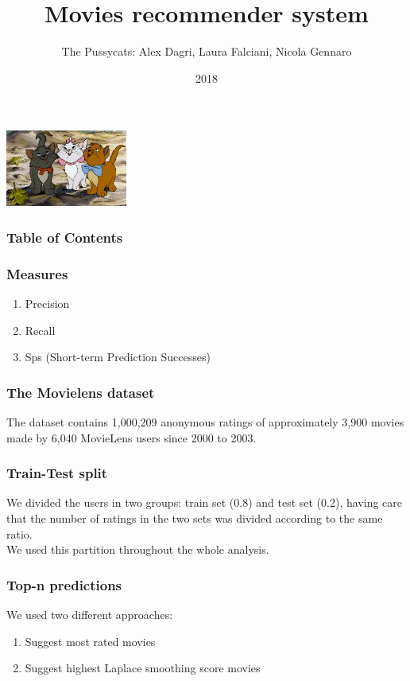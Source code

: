 \documentclass{beamer}
\title{Movies recommender system}
\author{The Pussycats: Alex Dagri, Laura Falciani, Nicola Gennaro}
\date{2018}
\begin{document}
\frame{\titlepage}
\includegraphics[width=4cm]{aristogatti.jpg}

\begin{frame}
\frametitle{Table of Contents}

\tableofcontents
\end{frame}






%
%

\begin{frame}

\frametitle{Measures}

\begin{enumerate}
	\item Precision
	\item Recall
	\item Sps (Short-term Prediction Successes) 
\end{enumerate}


\end{frame}



%
%


  \begin{frame}
  \frametitle{The Movielens dataset}

  The dataset contains 1,000,209 anonymous ratings of approximately 3,900 movies made by 6,040 MovieLens users since 2000 to 2003.
    
  \end{frame}


%
%
%

\begin{frame}

\frametitle{Train-Test split}
We divided the users in two groups: train set (0.8) and test set (0.2), having care that the number of ratings in the two sets was divided according to the same ratio. \\We used this partition throughout the whole analysis.

\end{frame}




%
%

\begin{frame}

\frametitle{Top-n predictions}

We used two different approaches:


\begin{enumerate}
	\item Suggest most rated movies
	\item Suggest highest Laplace smoothing score movies	
 \end{enumerate}


\end{frame}
\end{document}
